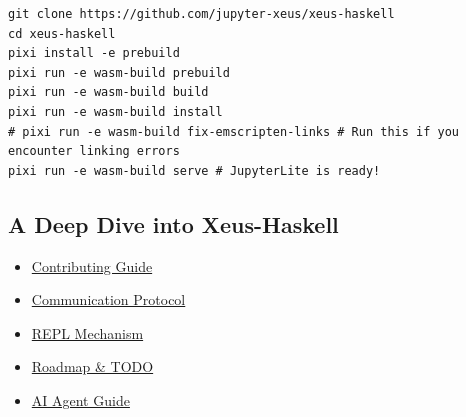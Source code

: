 \begin{verbatim}
git clone https://github.com/jupyter-xeus/xeus-haskell
cd xeus-haskell
pixi install -e prebuild
pixi run -e wasm-build prebuild
pixi run -e wasm-build build
pixi run -e wasm-build install
# pixi run -e wasm-build fix-emscripten-links # Run this if you encounter linking errors
pixi run -e wasm-build serve # JupyterLite is ready!
\end{verbatim}


\subsection{A Deep Dive into Xeus-Haskell}


\begin{itemize}
\item \href{./CONTRIBUTING.tex}{Contributing Guide}
\item \href{./COMMUNICATION.tex}{Communication Protocol}
\item \href{./REPL.tex}{REPL Mechanism}
\item \href{./TODO.tex}{Roadmap \& TODO}
\item \href{../AGENTS.md}{AI Agent Guide}
\end{itemize}
